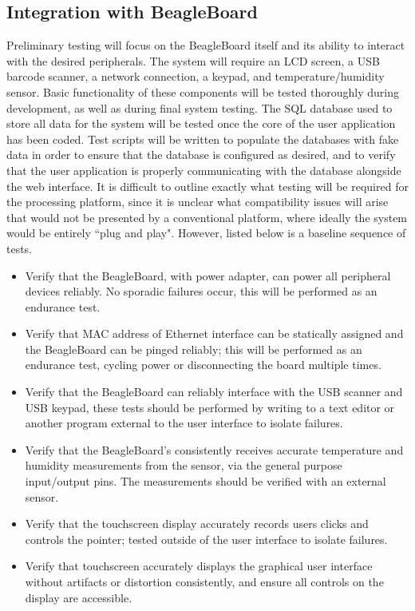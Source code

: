\documentclass[11pt,letterpaper]{article}
\begin{document}
\subsection{Integration with BeagleBoard}
Preliminary testing will focus on the BeagleBoard itself and its ability to interact with the desired peripherals.  The system will require an LCD screen, a USB barcode scanner, a network connection, a keypad, and temperature/humidity sensor.  Basic functionality of these components will be tested thoroughly during development, as well as during final system testing. 
\newline \quad \newline
The SQL database used to store all data for the system will be tested once the core of the user application has been coded.  Test scripts will be written to populate the databases with fake data in order to ensure that the database is configured as desired, and to verify that the user application is properly communicating with the database alongside the web interface.
\newline \quad \newline
It is difficult to outline exactly what testing will be required for the processing platform, since it is unclear what compatibility issues will arise that would not be presented by a conventional platform, where ideally the system would be entirely ``plug and play". However, listed below is a baseline sequence of tests.
\begin{itemize}
\item Verify that the BeagleBoard, with power adapter, can power all peripheral devices reliably. No sporadic failures occur, this will be performed as an endurance test.
\item Verify that MAC address of Ethernet interface can be statically assigned and the BeagleBoard can be pinged reliably; this will be performed as an endurance test, cycling power or disconnecting the board multiple times.
\item Verify that the BeagleBoard can reliably interface with the USB scanner and USB keypad, these tests should be performed by writing to a text editor or another program external to the user interface to isolate failures.
\item Verify that the BeagleBoard's consistently receives accurate temperature and humidity measurements from the sensor, via the general purpose input/output pins. The measurements should be verified with an external sensor.
\item Verify that the touchscreen display accurately records users clicks and controls the pointer; tested outside of the user interface to isolate failures.
\item Verify that touchscreen accurately displays the graphical user interface without artifacts or distortion consistently, and ensure all controls on the display are accessible.
\end{itemize}
\end{document}
